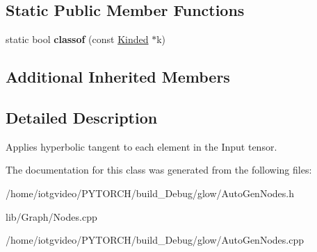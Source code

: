 \subsection*{Static Public Member Functions}
\begin{DoxyCompactItemize}
\item 
\mbox{\label{classglow_1_1_tanh_node_ae8a5eb748702c9193e5884149b6a1463}} 
static bool {\bfseries classof} (const \hyperlink{classglow_1_1_kinded}{Kinded} $\ast$k)
\end{DoxyCompactItemize}
\subsection*{Additional Inherited Members}


\subsection{Detailed Description}
Applies hyperbolic tangent to each element in the Input tensor. 

The documentation for this class was generated from the following files\+:\begin{DoxyCompactItemize}
\item 
/home/iotgvideo/\+P\+Y\+T\+O\+R\+C\+H/build\+\_\+\+Debug/glow/Auto\+Gen\+Nodes.\+h\item 
lib/\+Graph/Nodes.\+cpp\item 
/home/iotgvideo/\+P\+Y\+T\+O\+R\+C\+H/build\+\_\+\+Debug/glow/Auto\+Gen\+Nodes.\+cpp\end{DoxyCompactItemize}
